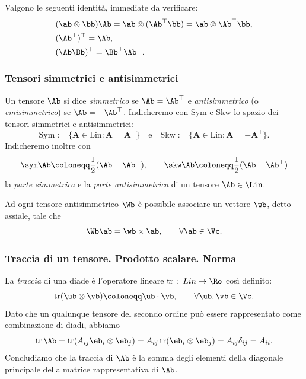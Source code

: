 Valgono le seguenti identità, immediate da verificare:
\begin{equation}
	\begin{aligned}
		& (\ab \otimes \bb)\Ab =\ab \otimes (\Ab ^\top \bb)=\ab \otimes \Ab ^\top \bb,\\
		& (\Ab ^\top)^\top =\Ab,\\
		& (\Ab \Bb)^\top= \Bb ^\top \Ab ^\top.
	\end{aligned}
\end{equation}

\subsubsection{Tensori simmetrici e antisimmetrici}

Un tensore $\Ab$ si dice \textit{simmetrico} se $\Ab =\Ab ^\top$ e \textit{antisimmetrico} (o \textit{emisimmetrico}) se  $\Ab =-\Ab ^\top$. Indicheremo con Sym e Skw lo spazio dei tensori simmetrici e antisimmetrici:
\begin{equation}
	\mathrm{Sym}:=\{\mathbf{A}\in\mathrm{Lin}:\mathbf{A}=\mathbf{A}^\top\}\quad\mathrm{e}\quad\mathrm{Skw}:=\{\mathbf{A}\in\mathrm{Lin}:\mathbf{A}=-\mathbf{A}^\top\}.
\end{equation}
 Indicheremo inoltre con
 \begin{equation}
 \sym \Ab\coloneqq \frac12 (\Ab+\Ab^\top), \qquad  \skw \Ab\coloneqq \frac12 (\Ab-\Ab^\top)
 \end{equation}
la \textit{parte simmetrica} e la \textit{parte antisimmetrica} di un tensore $\Ab \in \Lin$.

Ad ogni tensore antisimmetrico $\Wb$ è possibile associare un vettore $\wb$, detto assiale, tale che
\begin{equation}\label{Ww}
	\Wb\ab = \wb \times \ab, \qquad\forall \ab \in \Vc. 
\end{equation}


\subsubsection{Traccia di un tensore. Prodotto scalare. Norma}

La \textit{traccia} di una diade è l'operatore lineare $\operatorname{tr}\,:\, Lin \to \Ro$ così definito:
\begin{equation}
\operatorname{tr}(\ub \otimes \vb)\coloneqq \ub \cdot \vb, \qquad \forall \ub, \vb \in \Vc.
\end{equation}
Dato che un qualunque tensore del secondo ordine può essere rappresentato come combinazione di diadi, abbiamo
\begin{equation}
\operatorname{tr}\Ab =\operatorname{tr}(A_{ij}\eb_i\otimes \eb_j)=A_{ij}\operatorname{tr}(\eb_i\otimes \eb_j)=A_{ij}\delta_{ij}=A_{ii}.
\end{equation}
Concludiamo che la traccia di $\Ab$ è la somma degli elementi della diagonale principale della matrice rappresentativa di $\Ab$. 

